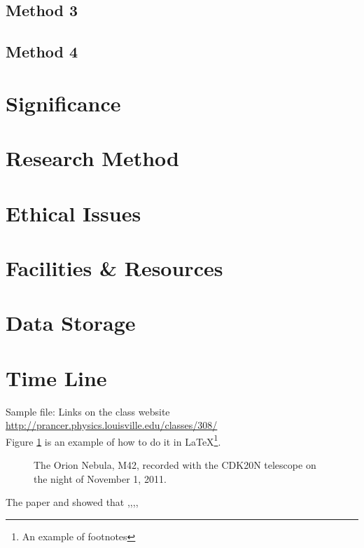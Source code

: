 \documentclass[12pt]{article}
\newcommand{\Color}[1]{%
    \pdfcolorstack\pdfcolorstackinit page direct{0 g}%
     push {#1 rg}%
}
\begin{document}
\subsection{Method 3}
\subsection{Method 4}
\section{Significance}
\section{Research Method}


\section{Ethical Issues}
\section{Facilities \& Resources}
\section{Data Storage}
\section{Time Line}


\newpage
Sample file: Links on the class website \url{http://prancer.physics.louisville.edu/classes/308/} \\
Figure \ref{fig:graph1} is an example of  how to do it in \LaTeX \footnote{An example of footnotes}.\\
\begin{figure}[h]  %
	\begin{center}
	\end{center}
	\caption{The Orion Nebula, M42, recorded with the CDK20N telescope on the night of November 1, 2011.}
	\label{fig:graph1}
\end{figure}

The paper \cite{cole1989kinematics} and \cite{sadeghi2009review} showed that ,,,,
\newpage


\end{document}
